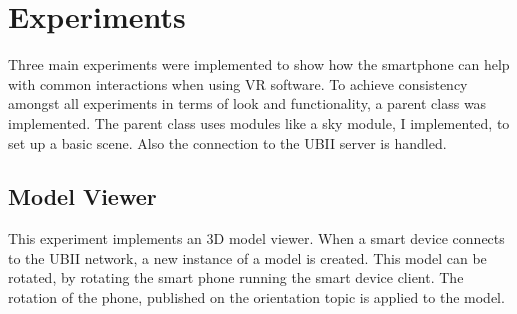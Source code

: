 \section{Experiments}\label{section:experiments}

Three main experiments were implemented to show how the smartphone can help with common interactions when using \ac{VR} software.
To achieve consistency amongst all experiments in terms of look and functionality, a parent class was implemented. The parent class uses modules like a sky module, I implemented, to set up a basic scene. Also the connection to the \ac{UBII} server is handled. 

\subsection{Model Viewer}\label{subsection:model-viewer}

This experiment implements an \ac{3D} model viewer. When a smart device connects to the \ac{UBII} network, a new instance of a model is created. This model can be rotated, by rotating the smart phone running the smart device client. The rotation of the phone, published on the orientation topic is applied to the model.


